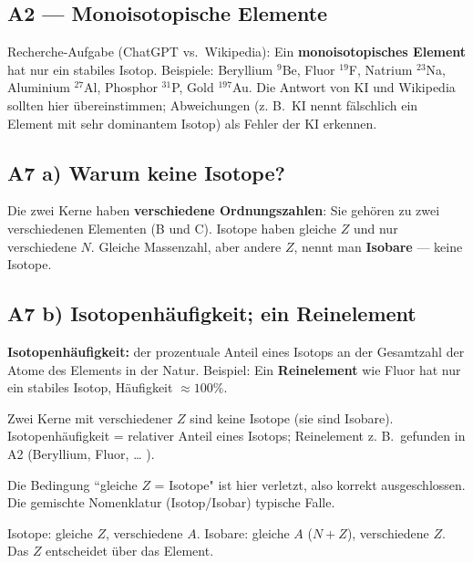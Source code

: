 
\subsection*{A2 --- Monoisotopische Elemente}
Recherche-Aufgabe (ChatGPT vs.\ Wikipedia): Ein \textbf{monoisotopisches
Element} hat nur ein stabiles Isotop. Beispiele: Beryllium ${}^{9}$Be,
Fluor ${}^{19}$F, Natrium ${}^{23}$Na, Aluminium ${}^{27}$Al, Phosphor
${}^{31}$P, Gold ${}^{197}$Au. Die Antwort von KI und Wikipedia sollten hier
übereinstimmen; Abweichungen (z. B.\ KI nennt fälschlich ein Element mit
sehr dominantem Isotop) als Fehler der KI erkennen.

\subsection*{A7 a) Warum keine Isotope?}
Die zwei Kerne haben \textbf{verschiedene Ordnungszahlen}: Sie gehören zu
zwei verschiedenen Elementen (B und C). Isotope haben gleiche $Z$ und nur
verschiedene $N$. Gleiche Massenzahl, aber andere $Z$, nennt man
\textbf{Isobare} --- keine Isotope.

\subsection*{A7 b) Isotopenhäufigkeit; ein Reinelement}
\textbf{Isotopenhäufigkeit:} der prozentuale Anteil eines Isotops an der
Gesamtzahl der Atome des Elements in der Natur. Beispiel: Ein \textbf{Reinelement}
wie Fluor hat nur ein stabiles Isotop, Häufigkeit $\approx 100\%$.

\begin{ergebnis}
Zwei Kerne mit verschiedener $Z$ sind keine Isotope (sie sind Isobare).
Isotopenhäufigkeit = relativer Anteil eines Isotops; Reinelement z. B.\ gefunden
in A2 (Beryllium, Fluor, \dots{} ).
\end{ergebnis}

\begin{kontrolle}
Die Bedingung ``gleiche $Z$ = Isotope" ist hier verletzt, also korrekt
ausgeschlossen. Die gemischte Nomenklatur (Isotop/Isobar) typische Falle.
\end{kontrolle}

\begin{merksatz}
Isotope: gleiche $Z$, verschiedene $A$. Isobare: gleiche $A$ ($N+Z$),
verschiedene $Z$. Das $Z$ entscheidet über das Element.
\end{merksatz}
